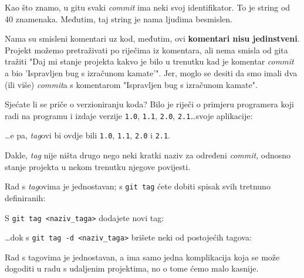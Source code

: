 Kao što znamo, u gitu svaki \emph{commit} ima neki svoj identifikator. 
To je string od 40 znamenaka.
Međutim, taj string je nama ljudima besmislen.

Nama su smisleni komentari uz kod, međutim, ovi \textbf{komentari nisu jedinstveni}.
Projekt možemo pretraživati po riječima iz komentara, ali nema smisla od gita tražiti "Daj mi stanje projekta kakvo je bilo u trenutku kad je komentar \emph{commit} a bio 'Ispravljen bug s izračunom kamate'".
Jer, moglo se desiti da smo imali dva (ili više) \emph{commit}a s komentarom "Ispravljen bug s izračunom kamate".

Sjećate li se priče o verzioniranju koda?
Bilo je riječi o primjeru programera koji radi na programu i izdaje verzije \verb+1.0+, \verb+1.1+, \verb+2.0+, \verb+2.1+\dots svoje aplikacije:



\dots{}e pa, \emph{tag}ovi bi ovdje bili \verb+1.0+, \verb+1.1+, \verb+2.0+ i \verb+2.1+.

Dakle, \emph{tag} nije ništa drugo nego neki kratki naziv za određeni \emph{commit}, odnosno stanje projekta u nekom trenutku njegove povijesti.

Rad s \emph{tag}ovima je jednostavan; s \verb+git tag+ ćete dobiti spisak svih tretnuno definiranih:



S \verb+git tag <naziv_taga>+ dodajete novi tag:


\dots{}dok s \verb+git tag -d <naziv_taga>+ brišete neki od postojećih tagova:


Rad s tagovima je jednostavan, a ima samo jedna komplikacija koja se može dogoditi u radu s udaljenim projektima, no o tome ćemo malo kasnije.
